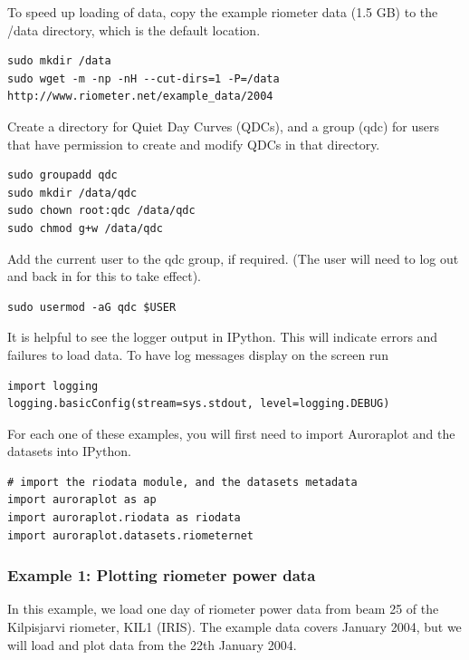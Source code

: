 \documentclass{article}
\begin{document}
To speed up loading of data, copy the example riometer data (1.5 GB) to the /data directory, which is the default location.

\begin{lstlisting}
sudo mkdir /data
sudo wget -m -np -nH --cut-dirs=1 -P=/data http://www.riometer.net/example_data/2004
\end{lstlisting}

Create a directory for Quiet Day Curves (QDCs), and a group (qdc) for users that have permission to create and modify QDCs in that directory.

\begin{lstlisting}
sudo groupadd qdc
sudo mkdir /data/qdc
sudo chown root:qdc /data/qdc
sudo chmod g+w /data/qdc
\end{lstlisting}

Add the current user to the qdc group, if required. (The user will need to log out and back in for this to take effect).

\begin{lstlisting}
sudo usermod -aG qdc $USER
\end{lstlisting}

It is helpful to see the logger output in IPython. This will indicate errors and failures to load data. To have log messages display on the screen run

\begin{lstlisting}[style=pythonstyle]
import logging
logging.basicConfig(stream=sys.stdout, level=logging.DEBUG)
\end{lstlisting}

For each one of these examples, you will first need to import Auroraplot and the datasets into IPython.

\begin{lstlisting}[style=pythonstyle]
# import the riodata module, and the datasets metadata
import auroraplot as ap
import auroraplot.riodata as riodata
import auroraplot.datasets.riometernet
\end{lstlisting}



\subsubsection{Example 1: Plotting riometer power data}

In this example, we load one day of riometer power data from beam 25 of the Kilpisjarvi riometer, KIL1 (IRIS). The example data covers January 2004, but we will load and plot data from the 22th January 2004.
\end{document}
